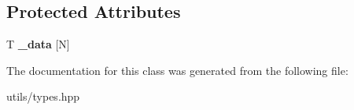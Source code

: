 \subsection*{Protected Attributes}
\begin{DoxyCompactItemize}
\item 
\hypertarget{classprimitive_a8153a3df173a0e9a4fed4e8a900d9da3}{}T {\bfseries \+\_\+data} \mbox{[}N\mbox{]}\label{classprimitive_a8153a3df173a0e9a4fed4e8a900d9da3}

\end{DoxyCompactItemize}


The documentation for this class was generated from the following file\+:\begin{DoxyCompactItemize}
\item 
utils/types.\+hpp\end{DoxyCompactItemize}

